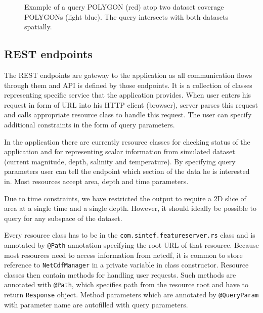 \documentclass[11pt,a4paper,titlepage,oneside]{report}
\begin{document}
\begin{figure}[!htb]
\begin{center}
\caption{Example of a query POLYGON (red) atop two dataset coverage POLYGONs (light blue). The query intersects with both datasets spatially.}
\label{fig:IndexerRequest}
\end{center}
\end{figure}

\subsection{REST endpoints}
The REST endpoints are gateway to the application as all communication flows through them and \gls{API} is defined by those endpoints. It is a collection of classes representing specific service that the application provides. When user enters his request in form of \gls{URL} into his \gls{HTTP} client (browser), server parses this request and calls appropriate resource class to handle this request. The user can specify additional constraints in the form of query parameters.

In the application there are currently resource classes for checking status of the application and for representing scalar information from simulated dataset (current magnitude, depth, salinity and temperature). By specifying query parameters user can tell the endpoint which section of the data he is interested in. Most resources accept area, depth and time parameters.

Due to time constraints, we have restricted the output to require a 2D slice of area at a single time and a single depth. However, it should ideally be possible to query for any subspace of the dataset.

Every resource class has to be in the \texttt{com.sintef.featureserver.rs} class and is annotated by \texttt{@Path} annotation specifying the root \gls{URL} of that resource. Because most resources need to access information from \gls{netcdf}, it is common to store reference to \texttt{NetCdfManager} in a private variable in class constructor. Resource classes then contain methods for handling user requests. Such methods are annotated with \texttt{@Path}, which specifies path from the resource root and have to return \texttt{Response} object. Method parameters which are annotated by \texttt{@QueryParam} with parameter name are autofilled with query parameters.
\end{document}
